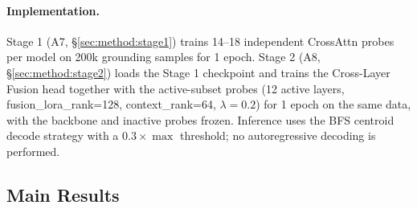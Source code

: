 \paragraph{Implementation.}
Stage 1 (A7, \S\ref{sec:method:stage1}) trains 14–18 independent CrossAttn probes per model on 200k grounding samples for 1 epoch. Stage 2 (A8, \S\ref{sec:method:stage2}) loads the Stage 1 checkpoint and trains the Cross-Layer Fusion head together with the active-subset probes (12 active layers, fusion\_lora\_rank=128, context\_rank=64, $\lambda{=}0.2$) for 1 epoch on the same data, with the backbone and inactive probes frozen. Inference uses the BFS centroid decode strategy with a $0.3{\times}\max$ threshold; no autoregressive decoding is performed.

\subsection{Main Results}
\label{sec:experiments:main}

\begin{table}[t]
\centering
\caption{
  \textbf{MMBench-GUI.} Baseline: overlap@1. \textbf{+ ZwerGe}: overlap@3.
}
\label{tab:main_mmbench}
\end{table}

